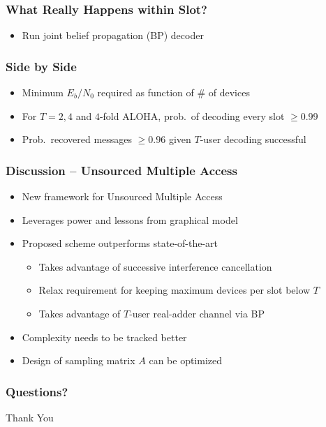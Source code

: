 \documentclass[10pt]{beamer}
\begin{document}
\begin{frame}
\frametitle{What Really Happens within Slot?}
\begin{center}
\scalebox{0.5}{}
\end{center}
\begin{itemize}
\item Run joint belief propagation (BP) decoder
\end{itemize}
\end{frame}


\begin{frame}
\frametitle{Side by Side}
\begin{center}
\scalebox{0.5}{}
\end{center}
\begin{itemize}
\item Minimum $E_b/N_0$ required as function of \# of devices
\item For $T=2,4$ and $4$-fold ALOHA, prob.\ of decoding every slot $\geq 0.99$
\item Prob.\ recovered messages $\geq 0.96$ given $T$-user decoding successful
\end{itemize}
\end{frame}


\begin{frame}
\frametitle{Discussion -- Unsourced Multiple Access}
\begin{itemize}
\item New framework for Unsourced Multiple Access
\item Leverages power and lessons from graphical model
\item Proposed scheme outperforms state-of-the-art
\begin{itemize}
\item Takes advantage of successive interference cancellation
\item Relax requirement for keeping maximum devices per slot below $T$
\item Takes advantage of $T$-user real-adder channel via BP
\end{itemize}
\item Complexity needs to be tracked better
\item Design of sampling matrix $A$ can be optimized
\end{itemize}
\end{frame}


\begin{frame}
\frametitle{Questions?}
\centerline{\Large Thank You}
\end{frame}
\end{document}
